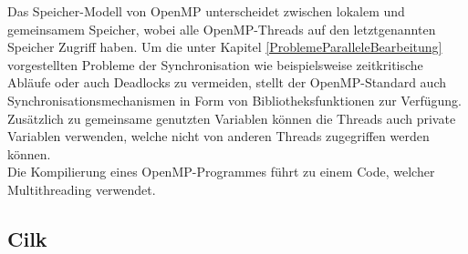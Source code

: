 			Das Speicher-Modell von OpenMP unterscheidet zwischen lokalem und gemeinsamem Speicher, wobei alle OpenMP-Threads auf den letztgenannten Speicher Zugriff haben. Um die unter Kapitel \ref{ProblemeParalleleBearbeitung} vorgestellten Probleme der Synchronisation wie beispielsweise zeitkritische Abläufe oder auch Deadlocks zu vermeiden, stellt der OpenMP-Standard auch Synchronisationsmechanismen in Form von Bibliotheksfunktionen zur Verfügung. Zusätzlich zu gemeinsame genutzten Variablen können die Threads auch private Variablen verwenden, welche nicht von anderen Threads zugegriffen werden können.\\
			Die Kompilierung eines OpenMP-Programmes führt zu einem Code, welcher Multithreading verwendet. \cite{ParaProgRauber} \cite{OpenMPWikipedia}
			
		\subsection{Cilk}
			\label{Cilk}
		
